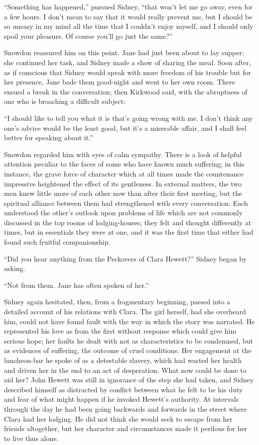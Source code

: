 ``Something has happened,'' pursued Sidney, ``that won't let me go away,
even for a few hours. I don't mean to say that it would really prevent
me, but I should be so uneasy in my mind all the time that I couldn't
enjoy myself, and I should only spoil your pleasure. Of course you'll go
just the same?''

Snowdon reassured him on this point. Jane had just been about to lay
supper; she continued her task, and Sidney made a show of sharing the
meal. Soon after, as if conscious that Sidney would speak with more
freedom of his trouble but for her presence, Jane bade them good-night
and went to her own room. There ensued a break in the conversation; then
Kirkwood said, with the abruptness of one who is broaching a difficult
subject:

``I should like to tell you what it is that's going wrong with me. I
don't think any one's advice would be the least good, but it's
{\protect\hypertarget{246}{}{}}a miserable affair, and I shall feel
better for speaking about it.''

Snowdon regarded him with eyes of calm sympathy. There is a look of
helpful attention peculiar to the faces of some who have known much
suffering; in this instance, the grave force of character which at all
times made the countenance impressive heightened the effect of its
gentleness. In external matters, the two men knew little more of each
other now than after their first meeting, but the spiritual alliance
between them had strengthened with every conversation. Each understood
the other's outlook upon problems of life which are not commonly
discussed in the top rooms of lodging-houses; they felt and thought
differently at times, but in essentials they were at one, and it was the
first time that either had found such fruitful companionship.

``Did you hear anything from the Peckovers of Clara Hewett?'' Sidney
began by asking.

``Not from them. Jane has often spoken of her.''

{\protect\hypertarget{247}{}{}}Sidney again hesitated, then, from a
fragmentary beginning, passed into a detailed account of his relations
with Clara. The girl herself, had she overheard him, could not have
found fault with the way in which the story was narrated. He represented
his love as from the first without response which could give him serious
hope; her faults he dealt with not as characteristics to be condemned,
but as evidences of suffering, the outcome of cruel conditions. Her
engagement at the luncheon-bar he spoke of as a detestable slavery,
which had wasted her health and driven her in the end to an act of
desperation. What now could be done to aid her? John Hewett was still in
ignorance of the step she had taken, and Sidney described himself as
distracted by conflict between what he felt to be his duty and fear of
what might happen if he invoked Hewett's authority. At intervals through
the day he had been going backwards and forwards in the street where
Clara had her lodging. He did not think she would seek to escape from
her friends {\protect\hypertarget{248}{}{}}altogether, but her character
and circumstances made it perilous for her to live thus alone.

